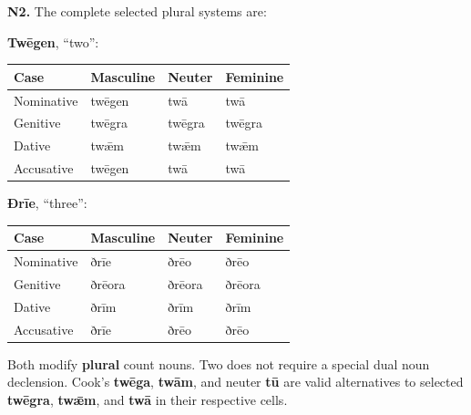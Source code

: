 \par\begin{minipage}{\linewidth}\raggedright
\textbf{N2.} The complete selected plural systems are:

\textbf{Twēgen}, “two”:

\par\begingroup
\fontsize{10.5}{13.2}\selectfont
\setlength{\LTleft}{0pt}\setlength{\LTright}{\fill}
\noindent
\begin{tabular}{@{}>{\raggedright\arraybackslash}p{28.89mm}>{\raggedright\arraybackslash}p{28.89mm}>{\raggedright\arraybackslash}p{28.89mm}>{\raggedright\arraybackslash}p{28.89mm}@{}}
\toprule
\textbf{Case} & \textbf{Masculine} & \textbf{Neuter} & \textbf{Feminine} \\
\midrule
Nominative & twēgen & twā & twā \\
Genitive & twēgra & twēgra & twēgra \\
Dative & twǣm & twǣm & twǣm \\
Accusative & twēgen & twā & twā \\
\bottomrule
\end{tabular}
\par\endgroup

\textbf{Ðrīe}, “three”:

\par\begingroup
\fontsize{10.5}{13.2}\selectfont
\setlength{\LTleft}{0pt}\setlength{\LTright}{\fill}
\noindent
\begin{tabular}{@{}>{\raggedright\arraybackslash}p{28.89mm}>{\raggedright\arraybackslash}p{28.89mm}>{\raggedright\arraybackslash}p{28.89mm}>{\raggedright\arraybackslash}p{28.89mm}@{}}
\toprule
\textbf{Case} & \textbf{Masculine} & \textbf{Neuter} & \textbf{Feminine} \\
\midrule
Nominative & ðrīe & ðrēo & ðrēo \\
Genitive & ðrēora & ðrēora & ðrēora \\
Dative & ðrīm & ðrīm & ðrīm \\
Accusative & ðrīe & ðrēo & ðrēo \\
\bottomrule
\end{tabular}
\par\endgroup

Both modify \textbf{plural} count nouns. Two does not require a special dual noun declension. Cook’s \textbf{twēga}, \textbf{twām}, and neuter \textbf{tū} are valid alternatives to selected \textbf{twēgra}, \textbf{twǣm}, and \textbf{twā} in their respective cells.

\end{minipage}\par\addvspace{4pt}

